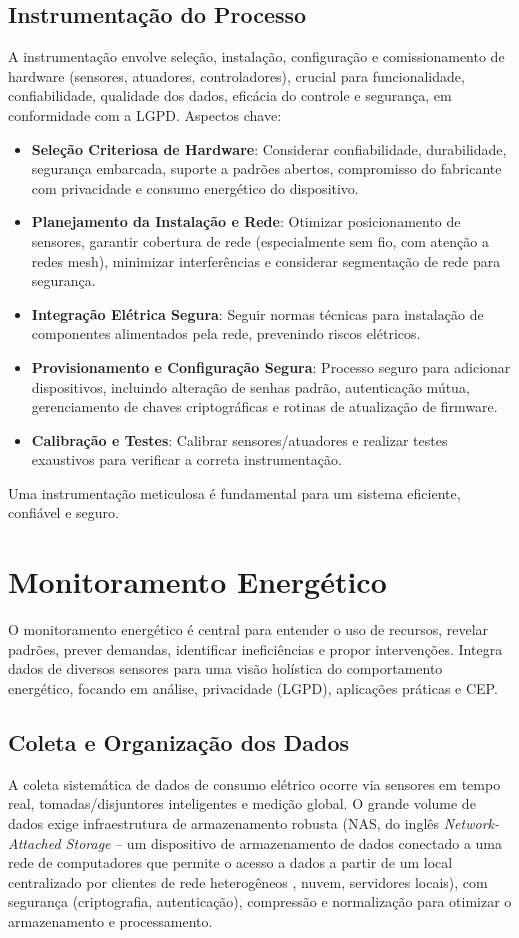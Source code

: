 \subsection{Instrumentação do Processo}
A instrumentação envolve seleção, instalação, configuração e comissionamento de hardware (sensores, atuadores, controladores), crucial para funcionalidade, confiabilidade, qualidade dos dados, eficácia do controle e segurança, em conformidade com a LGPD.
Aspectos chave:
\begin{itemize}
    \item \textbf{Seleção Criteriosa de Hardware}: Considerar confiabilidade, durabilidade, segurança embarcada, suporte a padrões abertos, compromisso do fabricante com privacidade e consumo energético do dispositivo.
    \item \textbf{Planejamento da Instalação e Rede}: Otimizar posicionamento de sensores, garantir cobertura de rede (especialmente sem fio, com atenção a redes mesh), minimizar interferências e considerar segmentação de rede para segurança.
    \item \textbf{Integração Elétrica Segura}: Seguir normas técnicas para instalação de componentes alimentados pela rede, prevenindo riscos elétricos.
    \item \textbf{Provisionamento e Configuração Segura}: Processo seguro para adicionar dispositivos, incluindo alteração de senhas padrão, autenticação mútua, gerenciamento de chaves criptográficas e rotinas de atualização de firmware.
    \item \textbf{Calibração e Testes}: Calibrar sensores/atuadores e realizar testes exaustivos para verificar a correta instrumentação.
\end{itemize}
Uma instrumentação meticulosa é fundamental para um sistema eficiente, confiável e seguro.

\section{Monitoramento Energético}
\label{sec:monitoramento_energetico}
O monitoramento energético é central para entender o uso de recursos, revelar padrões, prever demandas, identificar ineficiências e propor intervenções. Integra dados de diversos sensores para uma visão holística do comportamento energético, focando em análise, privacidade (LGPD), aplicações práticas e CEP.

\subsection{Coleta e Organização dos Dados}
A coleta sistemática de dados de consumo elétrico ocorre via sensores em tempo real, tomadas/disjuntores inteligentes e medição global. O grande volume de dados exige infraestrutura de armazenamento robusta (NAS, do inglês \textit{Network-Attached Storage} -- um dispositivo de armazenamento de dados conectado a uma rede de computadores que permite o acesso a dados a partir de um local centralizado por clientes de rede heterogêneos%
, nuvem, servidores locais), com segurança (criptografia, autenticação), compressão e normalização para otimizar o armazenamento e processamento.


